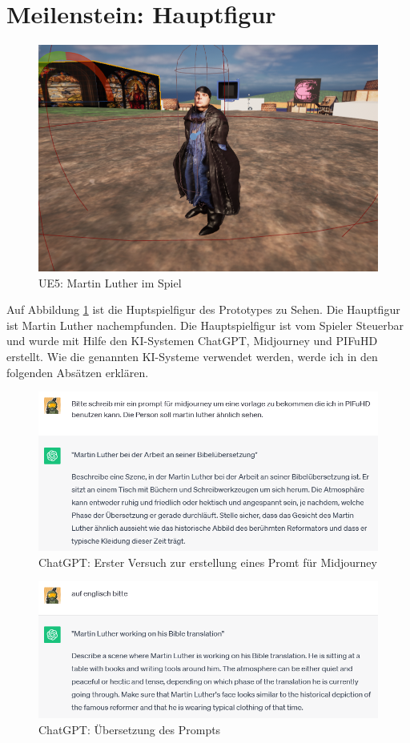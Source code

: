 \section {Meilenstein: Hauptfigur}
\begin{figure}[h]
	\centering
	\includegraphics[width=14cm]{BilderFuerBA/MartinLutherImSpiel.png}
	\caption{UE5: Martin Luther im Spiel}
	\label{MartinLutherImSpiel}
\end{figure}
Auf Abbildung \ref{MartinLutherImSpiel} ist die Huptspielfigur des Prototypes zu Sehen. Die Hauptfigur ist Martin Luther nachempfunden. Die Hauptspielfigur ist vom Spieler Steuerbar und wurde mit Hilfe den KI-Systemen ChatGPT, Midjourney und PIFuHD erstellt. Wie die genannten KI-Systeme verwendet werden, werde ich in den folgenden Absätzen erklären.
\begin{figure}[h]
	\centering
	\includegraphics[width=14cm]{BilderFuerBA/02.png}
	\caption{ChatGPT: Erster Versuch zur erstellung eines Promt für Midjourney}
	\label{ChatGPT_erster_Versuch_Midjourney_Promt}
\end{figure}
\begin{figure}
	\centering
	\includegraphics[width=14cm]{BilderFuerBA/03.png}
	\caption{ChatGPT: Übersetzung des Prompts}
	\label{ChatGPT_übersetzen}
\end{figure}
